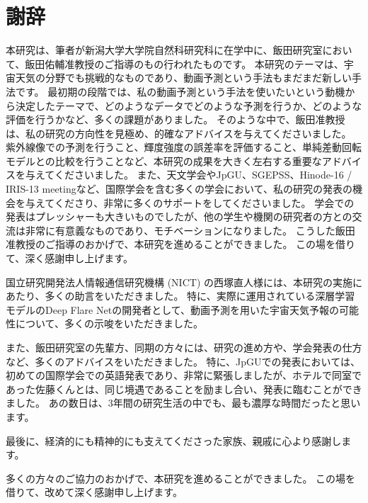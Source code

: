 \chapter*{謝辞}
  本研究は、筆者が新潟大学大学院自然科研究科に在学中に、飯田研究室において、飯田佑輔准教授のご指導のもの行われたものです。
  本研究のテーマは、宇宙天気の分野でも挑戦的なものであり、動画予測という手法もまだまだ新しい手法です。
  最初期の段階では、私の動画予測という手法を使いたいという動機から決定したテーマで、どのようなデータでどのような予測を行うか、どのような評価を行うかなど、多くの課題がありました。
  そのような中で、飯田准教授は、私の研究の方向性を見極め、的確なアドバイスを与えてくださいました。
  紫外線像での予測を行うこと、輝度強度の誤差率を評価すること、単純差動回転モデルとの比較を行うことなど、本研究の成果を大きく左右する重要なアドバイスを与えてくださいました。
  また、天文学会やJpGU、SGEPSS、Hinode-16 / IRIS-13 meetingなど、国際学会を含む多くの学会において、私の研究の発表の機会を与えてくださり、非常に多くのサポートをしてくださいました。
  学会での発表はプレッシャーも大きいものでしたが、他の学生や機関の研究者の方との交流は非常に有意義なものであり、モチベーションになりました。
  こうした飯田准教授のご指導のおかげで、本研究を進めることができました。
  この場を借りて、深く感謝申し上げます。
  
  国立研究開発法人情報通信研究機構 (NICT) の西塚直人様には、本研究の実施にあたり、多くの助言をいただきました。
  特に、実際に運用されている深層学習モデルのDeep Flare Netの開発者として、動画予測を用いた宇宙天気予報の可能性について、多くの示唆をいただきました。

  また、飯田研究室の先輩方、同期の方々には、研究の進め方や、学会発表の仕方など、多くのアドバイスをいただきました。
  特に、JpGUでの発表においては、初めての国際学会での英語発表であり、非常に緊張しましたが、ホテルで同室であった佐藤くんとは、同じ境遇であることを励まし合い、発表に臨むことができました。
  あの数日は、3年間の研究生活の中でも、最も濃厚な時間だったと思います。
  
  最後に、経済的にも精神的にも支えてくださった家族、親戚に心より感謝します。

  多くの方々のご協力のおかげで、本研究を進めることができました。
  この場を借りて、改めて深く感謝申し上げます。